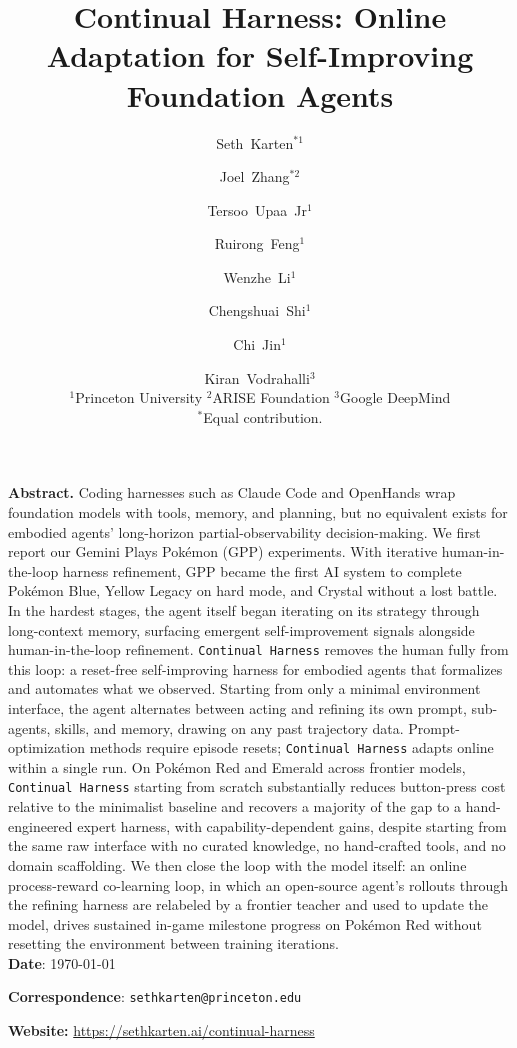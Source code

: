 \documentclass[11pt]{article}
\title{Continual Harness: Online Adaptation for Self-Improving Foundation Agents}
\author{Seth~Karten$^{*1}$ \and Joel~Zhang$^{*2}$ \and Tersoo~Upaa~Jr$^{1}$ \and Ruirong~Feng$^{1}$ \and Wenzhe~Li$^{1}$ \and Chengshuai~Shi$^{1}$ \and Chi~Jin$^{1}$ \and Kiran~Vodrahalli$^{3}$\\[0.3em]
  \small $^{1}$Princeton University \quad $^{2}$ARISE Foundation \quad $^{3}$Google DeepMind\\[0.2em]
  \small $^{*}$Equal contribution.}
\date{\vspace{0pt}}
\newcommand{\titleskip}{0.8em}
\begin{document}
\thispagestyle{empty}
\maketitle


\pagestyle{fancy}




\begin{tcolorbox}[
  colback       = LightGrey,
  colframe      = AccentColor!80!black,
  boxrule       = 0pt,
  arc           = 2pt,
  before skip   = 0pt,
  after skip    = \titleskip
  ]
\noindent\textbf{Abstract.} Coding harnesses such as Claude Code and OpenHands wrap foundation models with tools, memory, and planning, but no equivalent exists for embodied agents' long-horizon partial-observability decision-making. We first report our Gemini Plays Pok\'emon (GPP) experiments. With iterative human-in-the-loop harness refinement, GPP became the first AI system to complete Pok\'emon Blue, Yellow Legacy on hard mode, and Crystal without a lost battle. In the hardest stages, the agent itself began iterating on its strategy through long-context memory, surfacing emergent self-improvement signals alongside human-in-the-loop refinement. \texttt{Continual Harness} removes the human fully from this loop: a reset-free self-improving harness for embodied agents that formalizes and automates what we observed. Starting from only a minimal environment interface, the agent alternates between acting and refining its own prompt, sub-agents, skills, and memory, drawing on any past trajectory data. Prompt-optimization methods require episode resets; \texttt{Continual Harness} adapts online within a single run. On Pok\'emon Red and Emerald across frontier models, \texttt{Continual Harness} starting from scratch substantially reduces button-press cost relative to the minimalist baseline and recovers a majority of the gap to a hand-engineered expert harness, with capability-dependent gains, despite starting from the same raw interface with no curated knowledge, no hand-crafted tools, and no domain scaffolding. We then close the loop with the model itself: an online process-reward co-learning loop, in which an open-source agent's rollouts through the refining harness are relabeled by a frontier teacher and used to update the model, drives sustained in-game milestone progress on Pok\'emon Red without resetting the environment between training iterations.
\\

\textbf{Date}: \today

\textbf{Correspondence}: \texttt{sethkarten@princeton.edu}

\textbf{Website:} \url{https://sethkarten.ai/continual-harness}
\end{tcolorbox}
\end{document}
